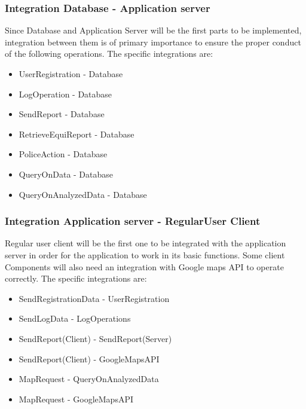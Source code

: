 \subsubsection{Integration Database - Application server}
Since Database and Application Server will be the first parts to be implemented, integration between them is of primary importance to ensure the proper conduct of the following operations.
The specific integrations are:
\begin{itemize}
	\item UserRegistration - Database
	\item LogOperation - Database
	\item SendReport - Database
	\item RetrieveEquiReport - Database
	\item PoliceAction - Database
	\item QueryOnData - Database
	\item QueryOnAnalyzedData - Database
\end{itemize}

\subsubsection{Integration Application server - RegularUser Client}
Regular user client will be the first one to be integrated with the application server in order for the application to work in its basic functions.
Some client Components will also need an integration with Google maps API to operate correctly.
The specific integrations are:
\begin{itemize}
	\item SendRegistrationData - UserRegistration
	\item SendLogData - LogOperations
	\item SendReport(Client) - SendReport(Server)
	\item SendReport(Client) - GoogleMapsAPI
	\item MapRequest - QueryOnAnalyzedData
	\item MapRequest - GoogleMapsAPI
\end{itemize}

